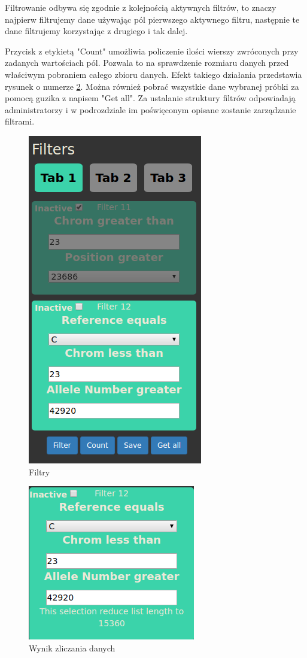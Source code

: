 \documentclass[a4paper,12pt,twoside]{article}
\begin{document}
Filtrowanie odbywa się zgodnie z kolejnością aktywnych filtrów, to znaczy najpierw filtrujemy
dane używając pól pierwszego aktywnego filtru, następnie te dane filtrujemy korzystając z drugiego i tak dalej.

Przycisk z etykietą "Count" umożliwia policzenie ilości wierszy zwróconych przy zadanych wartościach pól. Pozwala to na sprawdzenie rozmiaru danych przed właściwym pobraniem całego zbioru danych.
Efekt takiego działania przedstawia rysunek o numerze \ref{fig:countpic}.
Można również pobrać wszystkie dane wybranej próbki za pomocą guzika z napisem "Get all".
Za ustalanie struktury filtrów odpowiadają administratorzy i w podrozdziale im poświęconym
opisane zostanie zarządzanie filtrami.

\begin{figure}
  \centering
  \includegraphics{obrazy/aplikacja/filters.png}
  \caption{Filtry}
  \label{fig:filterspic}
\end{figure}

\begin{figure}
  \centering
  \includegraphics{obrazy/aplikacja/count.png}
  \caption{Wynik zliczania danych}
  \label{fig:countpic}
\end{figure}
\end{document}
